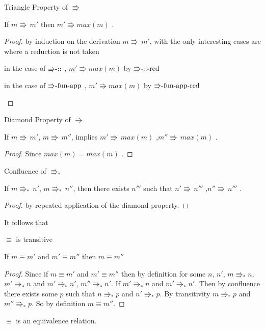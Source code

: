 \begin{lem}
Triangle Property of $\Rrightarrow$

If $m\Rrightarrow\,m'$ then $m'\Rrightarrow max\left(m\right)$ .
\end{lem}

\begin{proof}
by induction on the derivation $m\Rrightarrow\,m'$, with the only interesting cases are where a reduction is not taken
\begin{casenv}
\item in the case of $\textrm{\ensuremath{\Rrightarrow}-::}$ , $m'\Rrightarrow max\left(m\right)$
by $\textrm{\ensuremath{\Rrightarrow}-::-red}$
\item in the case of $\textrm{\ensuremath{\Rrightarrow}-fun-app}$ , $m'\Rrightarrow max\left(m\right)$
by $\textrm{\ensuremath{\Rrightarrow}-fun-app-red}$ 
\end{casenv}
\end{proof}
\begin{lem}
Diamond Property of $\Rrightarrow$

If $m\Rrightarrow\,m'$, $m\Rrightarrow\,m''$, implies $m'\Rrightarrow\,max\left(m\right)$
,$m''\Rrightarrow\,max\left(m\right)$ . 
\end{lem}

\begin{proof}
Since $max\left(m\right)=max\left(m\right)$ . 
\end{proof}
\begin{thm}
Confluence of $\Rrightarrow_{\ast}$ 

If $m\Rrightarrow_{\ast}\,n'$, $m\Rrightarrow_{\ast}\,n''$, then
there exists $n'''$ such that $n'\Rrightarrow\,n'''$ ,$n''\Rrightarrow\,n'''$
.
\end{thm}

\begin{proof}
by repeated application of the diamond property.
\end{proof}
It follows that
\begin{thm}
$\equiv$ is transitive

If $m\equiv m'$ and $m'\equiv m''$ then $m\equiv m''$
\end{thm}

\begin{proof}
Since if $m\equiv m'$ and $m'\equiv m''$ then by definition for some $n$, $n'$, $m\Rrightarrow_{\ast}n$, $m'\Rrightarrow_{\ast}n$ and $m'\Rrightarrow_{\ast}n'$, $m''\Rrightarrow_{\ast}n'$. If $m'\Rrightarrow_{\ast}n$ and $m'\Rrightarrow_{\ast}n'$.
Then by confluence there exists some $p$ such that $n\Rrightarrow_{\ast}p$ and $n'\Rrightarrow_{\ast}p$.
By transitivity $m\Rrightarrow_{\ast}p$ and $m''\Rrightarrow_{\ast}p$.
So by definition $m\equiv m''$.
\end{proof}
\begin{fact}
$\equiv$ is an equivalence relation.
\end{fact}


